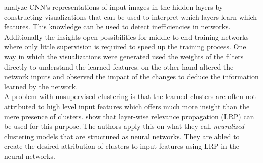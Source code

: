 \textcite{2018-zhang-visual} analyze CNN's representations of input images in the hidden layers by constructing 
visualizations that can be used to interpret which layers learn which features. This knowledge can be used to
detect inefficiencies in networks. Additionally the insights open possibilities for middle-to-end training
networks where only little supervision is required to speed up the training process.
One way in which the visualizations were generated used the weights of the filters directly to understand
the learned features. \textcite{2018-montavon-methods} on the other hand altered the network inputs and observed 
the impact of the changes to deduce the information learned by the network.\\

A problem with unsupervised clustering is that the learned clusters are often not attributed to high level input
features which offers much more insight than the mere presence of clusters. \textcite{2019-Kauffmann-from} show 
that layer-wise relevance propagation (LRP) can be used for this purpose. The authors apply this on
what they call \textit{neuralized} clustering models that are structured as neural networks. They are abled to 
create the desired attribution of clusters to input features using LRP in the neural networks. 



